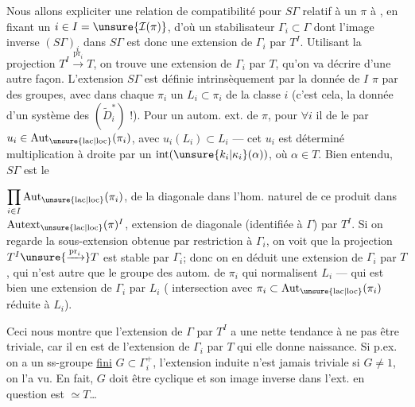 
Nous allons expliciter une relation de
compatibilité pour $S\Gamma$ relatif à un $\pi$
à , en fixant un $i\in I=\unsure{\mathcal I(\pi)}$,
d'où un stabilisateur $\Gamma_i\subset\Gamma$ dont l'image
inverse $(S\Gamma)_i$ dans $S\Gamma$ est donc une
extension de $\Gamma_i$ par $T^I$. Utilisant la
projection $T^I\xrightarrow{\mathrm{pr}_i}T$, on trouve une
extension de $\Gamma_i$ par $T$, qu'on va décrire
d'une autre façon. L'extension $S\Gamma$
est définie intrinsèquement par la
donnée de $I$   
 $\pi$ par des groupes, avec dans
chaque $\pi_i$ un $L_i\subset\pi_i$ de la classe $i$
(c'est cela, la donnée d'un système des
$(\widetilde D_i^*)$ !). Pour un autom. ext.   de $\pi$,
pour $\forall i$ il   de le
 par $u_i\in\operatorname{Aut}_{\unsure{\mathrm{lac}|\mathrm{loc}}}(\pi_i)$, avec $u_i(L_i)\subset L_i$
--- cet $u_i$ est déterminé  multiplication
à droite par un $\operatorname{int}(\unsure{k_i|\kappa_i}(\alpha))$, où $\alpha\in T$.
Bien entendu, $S\Gamma$ est le  

$\displaystyle\prod_{i\in I}\operatorname{Aut}_{\unsure{\mathrm{lac}|\mathrm{loc}}}(\pi_i)$,
  de la diagonale
dans l'hom. naturel de ce produit dans
$\operatorname{Autext}_{\unsure{\mathrm{lac}|\mathrm{loc}}}(\pi)^I$,   extension de
 diagonale (identifiée à $\Gamma$) par $T^I$.
Si on regarde la sous-extension  obtenue
par restriction à $\Gamma_i$, on voit que la
projection $T^I\unsure{\xrightarrow{\mathrm{pr}_i}}T$ est stable par $\Gamma_i$; donc
on en déduit une extension de $\Gamma_i$ par $T$,
qui n'est autre que le groupe des
autom.  de $\pi_i$ qui normalisent $L_i$
--- qui est bien une extension de $\Gamma_i$ par $L_i$
( intersection avec $\pi_i\subset\operatorname{Aut}_{\unsure{\mathrm{lac}|\mathrm{loc}}}(\pi_i)$ 
réduite à $L_i$).

Ceci nous montre que l'extension
de $\Gamma$ par $T^I$ a une nette tendance à
ne pas être triviale, car il en est 
 de l'extension de $\Gamma_i$ par $T$  qui elle donne
naissance. Si p.ex. on a un ss-groupe
\uline{fini} $G\subset\Gamma_i^+$, l'extension induite n'est
jamais triviale si $G\ne1$, on l'a vu. En
fait, $G$ doit être cyclique et son image inverse
dans l'ext. en question est $\simeq T$\ldots
{}

